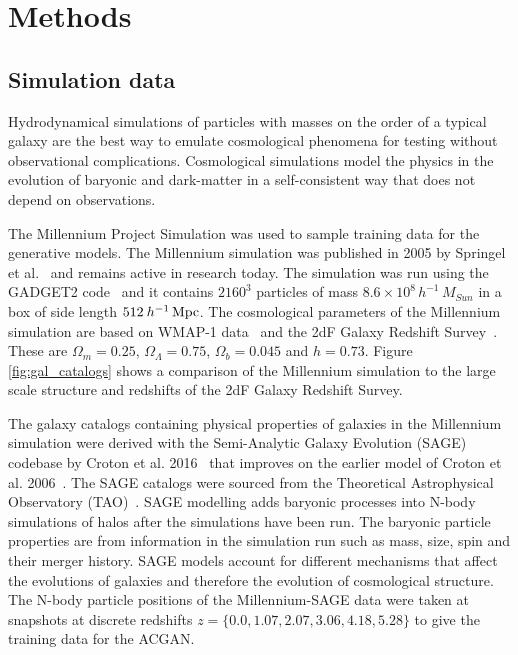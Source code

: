 \documentclass[twocolumn]{article}
\numberwithin{equation}{section}
\begin{document}

\section{Methods}\label{sec:methods}

\subsection{Simulation data}
Hydrodynamical simulations of particles with masses on the order of a typical galaxy are the best way to emulate 
cosmological phenomena for testing without observational complications. Cosmological simulations model the physics in 
the evolution of baryonic and dark-matter in a self-consistent way that does not depend on observations.

The Millennium Project Simulation was used to sample training data for the generative models. The Millennium simulation
was published in 2005 by Springel et al.~\cite{millsim} and remains active in research today. The simulation was run 
using the GADGET2 code~\cite{gadget2} and it contains $2160^3$ particles of mass $8.6 \times 10^8 \, h^{-1}  \, M_{Sun}$ 
in a box of side length $512  \: h^{-1} \,\textup{Mpc}$. The cosmological parameters of the Millennium simulation are 
based on WMAP-1 data~\cite{wmap1} and the 2dF Galaxy Redshift Survey~\cite{2df}. These are $\Omega_m=0.25$, 
$\Omega_{\Lambda}=0.75$, $\Omega_b=0.045$ and $h=0.73$. Figure \ref{fig:gal_catalogs} shows a comparison of the 
Millennium simulation to the large scale structure and redshifts of the 2dF Galaxy Redshift Survey. 

The galaxy catalogs containing physical properties of galaxies in the Millennium simulation were derived with the 
Semi-Analytic Galaxy Evolution (SAGE) codebase by Croton et al. 2016~\cite{Croton2016} that improves on the earlier 
model of Croton et al. 2006~\cite{Croton2006}. The SAGE catalogs were sourced from the Theoretical Astrophysical 
Observatory (TAO)~\cite{TAO}. SAGE modelling adds baryonic processes into N-body simulations of halos after the 
simulations have been run. The baryonic particle properties are from information in the simulation run such as mass, 
size, spin and their merger history. SAGE models account for different mechanisms that affect the evolutions of 
galaxies and therefore the evolution of cosmological structure. The N-body particle positions of the Millennium-SAGE 
data were taken at snapshots at discrete redshifts $z=\{0.0, 1.07, 2.07, 3.06, 4.18, 5.28\}$ to give the training 
data for the ACGAN. 
\end{document}
